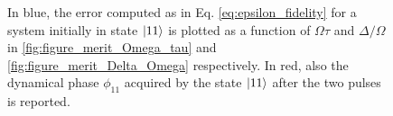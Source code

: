 \documentclass[rmp,10pt,onecolumn,fleqn,notitlepage]{revtex4-1}
\begin{document}
\begin{figure}[H]
\begin{minipage}[c]{0.49\linewidth}
\end{minipage}
\begin{minipage}[]{0.49\linewidth}
\centering
{}
\end{minipage}
\caption{In blue, the error computed as in Eq. \eqref{eq:epsilon_fidelity} for a system initially in state $\left\vert{11}\right\rangle$ is plotted as a function of $\Omega\tau$ and $\Delta/\Omega$ in \ref{fig:figure_merit_Omega_tau} and \ref{fig:figure_merit_Delta_Omega} respectively.  In red, also the dynamical phase $\phi_{11}$ acquired by the state $\left\vert{11}\right\rangle$ after the two pulses is reported. }
\label{fig:figure_merit}
\end{figure}
\end{document}
